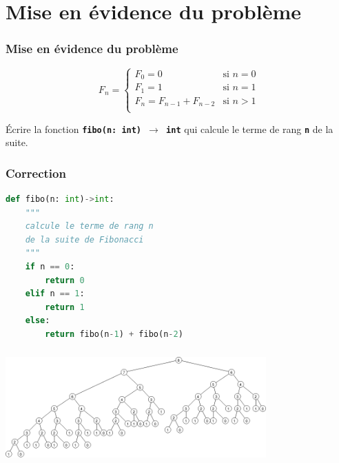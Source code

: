 \documentclass[svgnames,11pt]{beamer}
\begin{document}
\section{Mise en évidence du problème}
\begin{frame}
    \frametitle{Mise en évidence du problème}
    $$
        F_n = \left\{
        \begin{array}{ll}
            F_0 = 0                 & \mbox{si } n=0 \\
            F_1=1                   & \mbox{si } n=1 \\
            F_{n} = F_{n-1}+F_{n-2} & \mbox{si } n>1 \\
        \end{array}
        \right.
    $$
\begin{activite}
Écrire la fonction \textbf{\texttt{fibo(n: int) $\rightarrow$ int}} qui calcule le terme de rang \textbf{\texttt{n}} de la suite.
\end{activite}
\end{frame}
\begin{frame}[fragile]
    \frametitle{Correction}

\begin{center}
\begin{lstlisting}[language=Python , basicstyle=\ttfamily\small, xleftmargin=2em, xrightmargin=2em]
def fibo(n: int)->int:
    """
    calcule le terme de rang n
    de la suite de Fibonacci
    """
    if n == 0:
        return 0
    elif n == 1:
        return 1
    else:
        return fibo(n-1) + fibo(n-2)
\end{lstlisting}
\end{center}

\end{frame}
\begin{frame}
    \frametitle{}
    \begin{center}
    \centering
    \includegraphics[width=10cm]{ressources/fibo1.png}
    \label{IMG}
    \end{center}
\end{frame}
\end{document}
